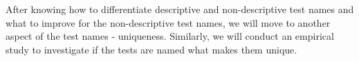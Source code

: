 



After knowing how to differentiate descriptive and non-descriptive test names and what to improve for the non-descriptive test names, we will move to another aspect of the test names - uniqueness.
%
Similarly, we will conduct an empirical study to investigate if the tests are named what makes them unique.
